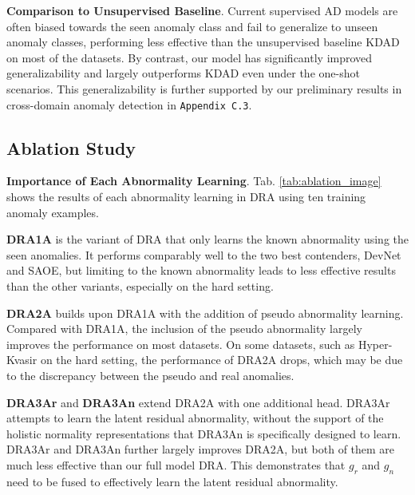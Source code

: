 \documentclass[10pt,twocolumn,letterpaper]{article}
\begin{document}
\textbf{Comparison to Unsupervised Baseline}. Current supervised AD models are often biased towards the seen anomaly class and fail to generalize to unseen anomaly classes, performing less effective than the unsupervised baseline KDAD on most of the datasets. By contrast, our model has significantly improved generalizability and largely outperforms KDAD even under the one-shot scenarios. This generalizability is further supported by our preliminary results in cross-domain anomaly detection in \texttt{Appendix C.3}.



\subsection{Ablation Study} \label{sec:5.3.1}
\textbf{Importance of Each Abnormality Learning}.  
Tab. \ref{tab:ablation_image} shows the results of each abnormality learning in DRA using ten training anomaly examples.

\textbf{DRA1A} is the variant of DRA that only learns the known abnormality using the seen anomalies.
It performs comparably well to the two best contenders, DevNet and SAOE,
but limiting to the known abnormality leads to less effective results than the other variants, especially on the hard setting.

\textbf{DRA2A} builds upon DRA1A with the addition of pseudo abnormality learning.
Compared with DRA1A, the inclusion of the pseudo abnormality largely improves the performance on most datasets. 
On some datasets, such as Hyper-Kvasir on the hard setting, the performance of DRA2A drops, which may be due to the discrepancy between the pseudo and real anomalies. 

\textbf{DRA3Ar} and \textbf{DRA3An} extend DRA2A with one additional head. DRA3Ar attempts to learn the latent residual abnormality, without the support of the holistic normality representations that DRA3An is specifically designed to learn. DRA3Ar and DRA3An further largely improves DRA2A, but both of them are much less effective than our full model DRA. This demonstrates that $g_{r}$ and $g_{n}$ need to be fused to effectively learn the latent residual abnormality.
\end{document}
